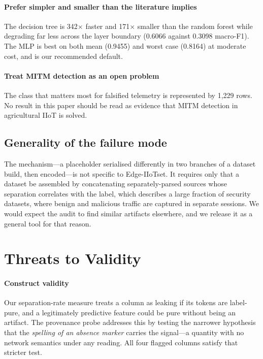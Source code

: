 \paragraph{Prefer simpler and smaller than the literature implies} The decision
tree is 342$\times$ faster and 171$\times$ smaller than the random forest while
degrading far less across the layer boundary (0.6066 against 0.3098 macro-F1).
The MLP is best on both mean (0.9455) and worst case (0.8164) at moderate cost,
and is our recommended default.

\paragraph{Treat MITM detection as an open problem} The class that matters most
for falsified telemetry is represented by 1{,}229 rows. No result in this paper
should be read as evidence that MITM detection in agricultural IIoT is solved.

\subsection{Generality of the failure mode}

The mechanism---a placeholder serialised differently in two branches of a
dataset build, then encoded---is not specific to Edge-IIoTset. It requires only
that a dataset be assembled by concatenating separately-parsed sources whose
separation correlates with the label, which describes a large fraction of
security datasets, where benign and malicious traffic are captured in separate
sessions. We would expect the audit to find similar artifacts elsewhere, and we
release it as a general tool for that reason.

\section{Threats to Validity}

\paragraph{Construct validity} Our separation-rate measure treats a column as
leaking if its tokens are label-pure, and a legitimately predictive feature
could be pure without being an artifact. The provenance probe addresses this by
testing the narrower hypothesis that the \emph{spelling of an absence marker}
carries the signal---a quantity with no network semantics under any reading.
All four flagged columns satisfy that stricter test.

